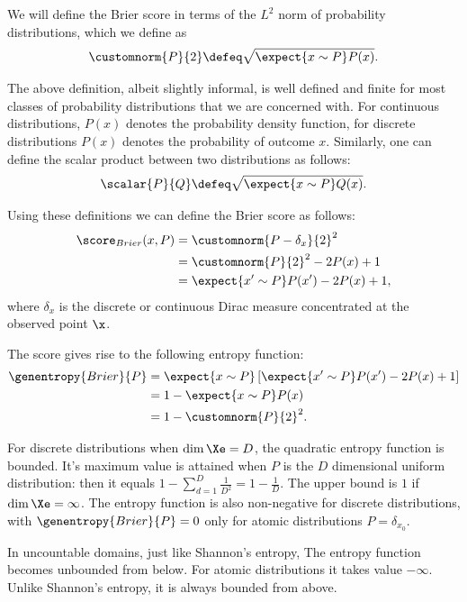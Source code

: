 We will define the Brier score in terms of the $L^2$ norm of probability distributions, which we define as
%
\begin{equation}
	\customnorm{P}{2} \defeq \sqrt{\expect{x \sim P} P(x)}.
\end{equation}

The above definition, albeit slightly informal, is well defined and finite for most classes of probability distributions that we are concerned with. For continuous distributions, $P(x)$ denotes the probability density function, for discrete distributions $P(x)$ denotes the probability of outcome $x$. Similarly, one can define the scalar product between two distributions as follows:
%
\begin{equation}
	\scalar{P}{Q} \defeq \sqrt{\expect{x \sim P} Q(x)}.
\end{equation}

Using these definitions we can define the Brier score as follows:
%
\begin{align}
	\score_{Brier}(x,P) &= \customnorm{P - \delta_{x}}{2}^2\\
		&= \customnorm{P}{2}^{2} - 2P(x)  + 1\\
		&= \expect{x' \sim P} P(x') - 2P(x) + 1,
\end{align}
%
where $\delta_{x}$ is the discrete or continuous Dirac measure concentrated at the observed point $\x$.

The score gives rise to the following entropy function:
%
\begin{align}
	\genentropy{Brier}{P} &= \expect{x \sim P}\left[\expect{x' \sim P} P(x') - 2P(x) + 1\right]\\
		&= 1 -\expect{x \sim P} P(x)\\
		&= 1 - \customnorm{P}{2}^2.
\end{align}

For discrete distributions when $\dim \Xe = D$, the quadratic entropy function is bounded. It's maximum value is attained when $P$ is the $D$ dimensional uniform distribution: then it equals $1 - \sum_{d=1}^{D}\frac{1}{D^2} = 1 - \frac{1}{D}$. The upper bound is $1$ if $\dim \Xe = \infty$. The entropy function is also non-negative for discrete distributions, with $\genentropy{Brier}{P}=0$ only for atomic distributions $P=\delta_{x_0}$.

In uncountable domains, just like Shannon's entropy, The entropy function becomes unbounded from below. For atomic distributions it takes value $-\infty$. Unlike Shannon's entropy, it is always bounded from above.

